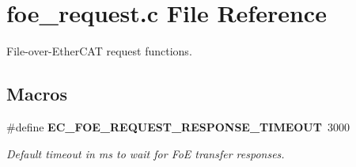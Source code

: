 \section{foe\-\_\-request.\-c File Reference}
\label{foe__request_8c}


File-\/over-\/\-Ether\-C\-A\-T request functions.  


\subsection*{Macros}
\begin{DoxyCompactItemize}
\item 
\#define {\bf E\-C\-\_\-\-F\-O\-E\-\_\-\-R\-E\-Q\-U\-E\-S\-T\-\_\-\-R\-E\-S\-P\-O\-N\-S\-E\-\_\-\-T\-I\-M\-E\-O\-U\-T}~3000\label{foe__request_8c_abb224b1d4a9cdbad17f5e3403e962784}

\begin{DoxyCompactList}\small\item\em Default timeout in ms to wait for Fo\-E transfer responses. \end{DoxyCompactList}\end{DoxyCompactItemize}
